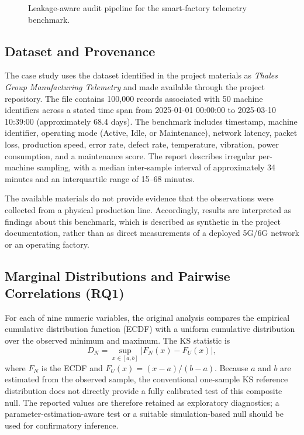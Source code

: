\documentclass[conference]{IEEEtran}
\begin{document}
\begin{figure}[t]
\caption{Leakage-aware audit pipeline for the smart-factory telemetry benchmark.}
\label{fig:architecture}
\end{figure}

\subsection{Dataset and Provenance}
The case study uses the dataset identified in the project materials as \textit{Thales Group Manufacturing Telemetry} and made available through the project repository. The file contains 100,000 records associated with 50 machine identifiers across a stated time span from 2025-01-01 00:00:00 to 2025-03-10 10:39:00 (approximately 68.4 days). The benchmark includes timestamp, machine identifier, operating mode (Active, Idle, or Maintenance), network latency, packet loss, production speed, error rate, defect rate, temperature, vibration, power consumption, and a maintenance score. The report describes irregular per-machine sampling, with a median inter-sample interval of approximately 34 minutes and an interquartile range of 15--68 minutes.

The available materials do not provide evidence that the observations were collected from a physical production line. Accordingly, results are interpreted as findings about this benchmark, which is described as synthetic in the project documentation, rather than as direct measurements of a deployed 5G/6G network or an operating factory.

\subsection{Marginal Distributions and Pairwise Correlations (RQ1)}
For each of nine numeric variables, the original analysis compares the empirical cumulative distribution function (ECDF) with a uniform cumulative distribution over the observed minimum and maximum. The KS statistic is
\begin{equation}
D_N = \sup_{x \in [a, b]} |F_N(x) - F_U(x)|,
\label{eq:ks}
\end{equation}
where $F_N$ is the ECDF and $F_U(x) = (x - a)/(b - a)$. Because $a$ and $b$ are estimated from the observed sample, the conventional one-sample KS reference distribution does not directly provide a fully calibrated test of this composite null. The reported values are therefore retained as exploratory diagnostics; a parameter-estimation-aware test or a suitable simulation-based null should be used for confirmatory inference.
\end{document}
